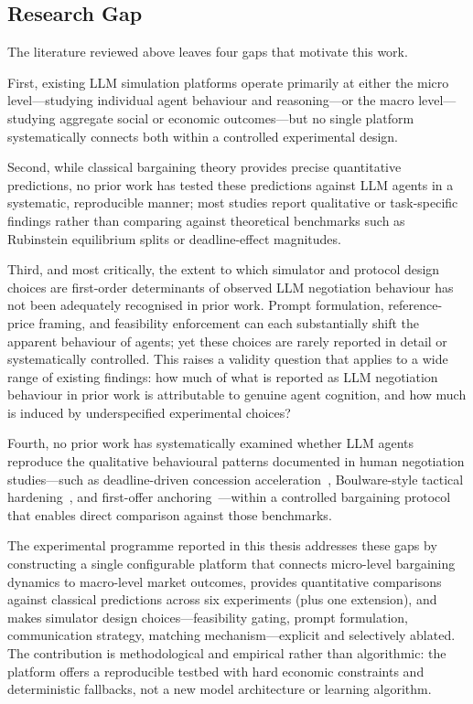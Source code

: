 \subsection{Research Gap}
\label{sec:rw_gap}

The literature reviewed above leaves four gaps that motivate this work.

First, existing LLM simulation platforms operate primarily at either the micro level---studying individual agent behaviour and reasoning---or the macro level---studying aggregate social or economic outcomes---but no single platform systematically connects both within a controlled experimental design.

Second, while classical bargaining theory provides precise quantitative predictions, no prior work has tested these predictions against LLM agents in a systematic, reproducible manner; most studies report qualitative or task-specific findings rather than comparing against theoretical benchmarks such as Rubinstein equilibrium splits or deadline-effect magnitudes.

Third, and most critically, the extent to which simulator and protocol design choices are first-order determinants of observed LLM negotiation behaviour has not been adequately recognised in prior work.  Prompt formulation, reference-price framing, and feasibility enforcement can each substantially shift the apparent behaviour of agents; yet these choices are rarely reported in detail or systematically controlled.  This raises a validity question that applies to a wide range of existing findings: how much of what is reported as LLM negotiation behaviour in prior work is attributable to genuine agent cognition, and how much is induced by underspecified experimental choices?

Fourth, no prior work has systematically examined whether LLM agents reproduce the qualitative behavioural patterns documented in human negotiation studies---such as deadline-driven concession acceleration~\cite{roth1988deadline}, Boulware-style tactical hardening~\cite{raiffa1982}, and first-offer anchoring~\cite{galinsky2001}---within a controlled bargaining protocol that enables direct comparison against those benchmarks.

The experimental programme reported in this thesis addresses these gaps by constructing a single configurable platform that connects micro-level bargaining dynamics to macro-level market outcomes, provides quantitative comparisons against classical predictions across six experiments (plus one extension), and makes simulator design choices---feasibility gating, prompt formulation, communication strategy, matching mechanism---explicit and selectively ablated.  The contribution is methodological and empirical rather than algorithmic: the platform offers a reproducible testbed with hard economic constraints and deterministic fallbacks, not a new model architecture or learning algorithm.



